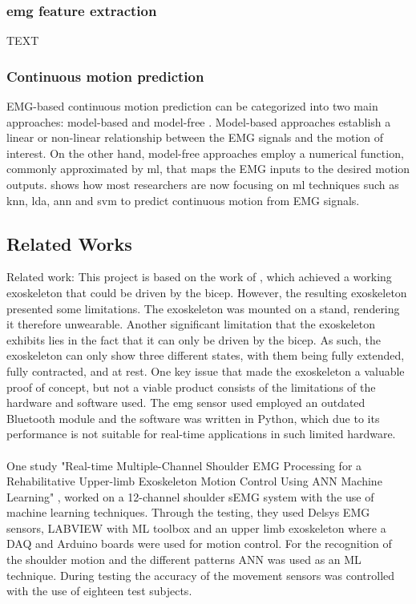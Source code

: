 \subsubsection{\acs{emg} feature extraction}

TEXT

\subsubsection{Continuous motion prediction}

EMG-based continuous motion prediction can be categorized into two main approaches: model-based and model-free \cite{EMGprediction}. Model-based approaches
establish a linear or non-linear relationship between the EMG signals and the motion of interest. On the other hand, model-free approaches
employ a numerical function, commonly approximated by \ac{ml}, that maps the EMG inputs to the desired motion outputs. \cite{ANNFuzzy} shows how most 
researchers are now focusing on \ac{ml} techniques such as \ac{knn}, \ac{lda}, \ac{ann} and \ac{svm} to predict continuous motion from EMG signals.


\subsection{Related Works}
Related work: %
This project is based on the work of \cite{AFES}, which achieved a working exoskeleton that could be driven by the bicep. However, the resulting 
exoskeleton presented some limitations. The exoskeleton was mounted on a stand, rendering it therefore unwearable. Another significant limitation 
that the exoskeleton exhibits lies in the fact that it can only be driven by the bicep. As such, the exoskeleton can only show three different states, 
with them being fully extended, fully contracted, and at rest. One key issue that made the exoskeleton a valuable proof of concept, but not a viable 
product consists of the limitations of the hardware and software used. The \acs{emg} sensor used employed an outdated Bluetooth module and the software was 
written in Python, which due to its performance is not suitable for real-time applications in such limited hardware. 
\\\\
One study "Real-time Multiple-Channel Shoulder EMG Processing for a Rehabilitative Upper-limb Exoskeleton Motion Control Using ANN Machine Learning" \cite{shoulderexo},
worked on a 12-channel shoulder sEMG system with the use of machine learning techniques. Through the testing, they used Delsys EMG sensors, LABVIEW with ML toolbox and an 
upper limb exoskeleton where a DAQ and Arduino boards were used for motion control. For the recognition of the shoulder motion and the different patterns ANN was used as an 
ML technique. During testing the accuracy of the movement sensors was controlled with the use of eighteen test subjects.